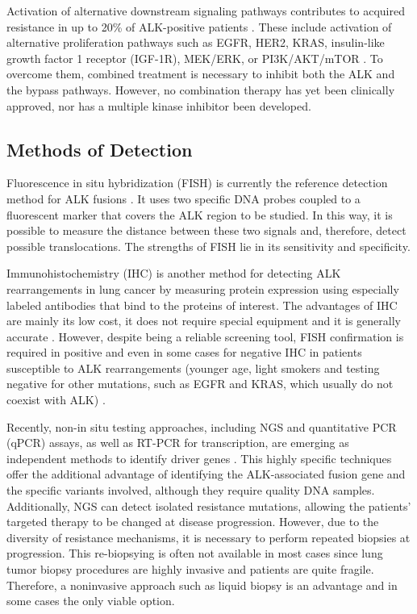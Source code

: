 Activation of alternative downstream signaling pathways contributes to acquired resistance in up to 20\% of ALK-positive patients \cite{TKI_acquired, Bypass}. These include activation of alternative proliferation pathways such as EGFR, HER2, KRAS, insulin-like growth factor 1 receptor (IGF-1R), MEK\slash ERK, or PI3K\slash AKT\slash mTOR \cite{ALK_resistance}. To overcome them, combined treatment is necessary to inhibit both the ALK and the bypass pathways. However, no combination therapy has yet been clinically approved, nor has a multiple kinase inhibitor been developed.

\subsection{Methods of Detection}

Fluorescence in situ hybridization (FISH) is currently the reference detection method for ALK fusions \cite{EML4_ALK_variants}. It uses two specific DNA probes coupled to a fluorescent marker that covers the ALK region to be studied. In this way, it is possible to measure the distance between these two signals and, therefore, detect possible translocations. The strengths of FISH lie in its sensitivity and specificity.

Immunohistochemistry (IHC) is another method for detecting ALK rearrangements in lung cancer by measuring protein expression using especially labeled antibodies that bind to the proteins of interest. The advantages of IHC are mainly its low cost, it does not require special equipment and it is generally accurate \cite{ALK_inhibitors}. However, despite being a reliable screening tool, FISH confirmation is required in positive and even in some cases for negative IHC in patients susceptible to ALK rearrangements (younger age, light smokers and testing negative for other mutations, such as EGFR and KRAS, which usually do not coexist with ALK) \cite{FISH_IHC}.

Recently, non-in situ testing approaches, including NGS and quantitative PCR (qPCR) assays, as well as RT-PCR for transcription, are emerging as independent methods to identify driver genes \cite{EML4_ALK_variants}. This highly specific techniques offer the additional advantage of identifying the ALK-associated fusion gene and the specific variants involved, although they require quality DNA samples. Additionally, NGS can detect isolated resistance mutations, allowing the patients' targeted therapy to be changed at disease progression. However, due to the diversity of resistance mechanisms, it is necessary to perform repeated biopsies at progression. This re-biopsying is often not available in most cases since lung tumor biopsy procedures are highly invasive and patients are quite fragile. Therefore, a noninvasive approach such as liquid biopsy is an advantage and in some cases the only viable option.


